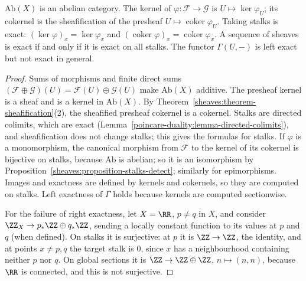 \begin{proposition}\label{sheaves:proposition-abelian-category}
$\mathrm{Ab}(X)$ is an abelian category. The kernel of $\varphi \colon \mathcal{F} \to \mathcal{G}$ is $U \mapsto \ker\varphi_U$; its cokernel is the sheafification of the presheaf
$U \mapsto \operatorname{coker}\varphi_U$. Taking stalks is exact: $(\ker\varphi)_x = \ker\varphi_x$ and $(\operatorname{coker}\varphi)_x = \operatorname{coker}\varphi_x$. A sequence of sheaves is exact if
and only if it is exact on all stalks. The functor $\Gamma(U, -)$ is left exact but not exact in general.
\end{proposition}

\begin{proof}
Sums of morphisms and finite direct sums $(\mathcal{F} \oplus \mathcal{G})(U) = \mathcal{F}(U) \oplus \mathcal{G}(U)$ make $\mathrm{Ab}(X)$ additive. The presheaf kernel is a sheaf and is
a kernel in $\mathrm{Ab}(X)$. By Theorem~\ref{sheaves:theorem-sheafification}(2), the sheafified presheaf cokernel is a cokernel. Stalks are directed colimits, which are exact
(Lemma~\ref{poincare-duality:lemma-directed-colimits}), and sheafification does not change stalks; this gives the formulas for stalks. If $\varphi$ is a monomorphism, the
canonical morphism from $\mathcal{F}$ to the kernel of its cokernel is bijective on stalks, because $\mathrm{Ab}$ is abelian; so it is an isomorphism by
Proposition~\ref{sheaves:proposition-stalks-detect}; similarly for epimorphisms. Images and exactness are defined by kernels and cokernels, so they are computed on stalks. Left
exactness of $\Gamma$ holds because kernels are computed sectionwise.

For the failure of right exactness, let $X = \RR$, $p \neq q$ in $X$, and consider $\ZZ_X \to p_*\ZZ \oplus q_*\ZZ$, sending a locally constant function to its values at $p$ and $q$ (when
defined). On stalks it is surjective: at $p$ it is $\ZZ \to \ZZ$, the identity, and at points $x \neq p, q$ the target stalk is $0$, since $x$ has a neighbourhood containing neither
$p$ nor $q$. On global sections it is $\ZZ \to \ZZ \oplus \ZZ$, $n \mapsto (n, n)$, because $\RR$ is connected, and this is not surjective.
\end{proof}

